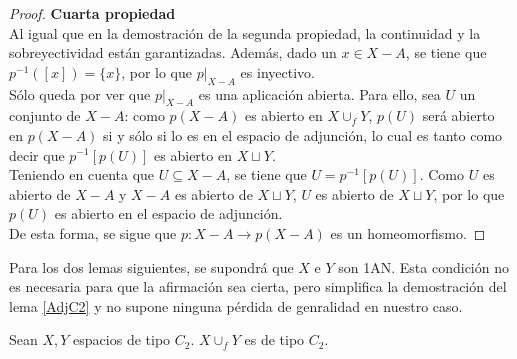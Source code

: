 \begin{proof}
\noindent \textbf{Cuarta propiedad}
\\
Al igual que en la demostración de la segunda propiedad, la continuidad y la sobreyectividad están garantizadas. Además, dado un $x \in X-A$, se tiene que $p^{-1}([x])=\{x\}$, por lo que $p|_{X-A}$ es inyectivo.
\\

Sólo queda por ver que $p|_{X-A}$ es una aplicación abierta. Para ello, sea $U$ un conjunto de $X-A$: como $p(X-A)$ es abierto en $X\cup_f Y$, $p(U)$ será abierto en $p(X-A)$ si y sólo si lo es en el espacio de adjunción, lo cual es tanto como decir que $p^{-1}[p(U)]$ es abierto en $X\sqcup Y$.
\\

Teniendo en cuenta que $U \subseteq X-A$, se tiene que $U=p^{-1}[p(U)]$. Como $U$ es abierto de $X-A$ y $X-A$ es abierto de $X\sqcup Y$, $U$ es abierto de $X\sqcup Y$, por lo que $p(U)$ es abierto en el espacio de adjunción.
\\

De esta forma, se sigue que $p: X-A \longrightarrow p(X-A)$ es un homeomorfismo.
\end{proof}

Para los dos lemas siguientes, se supondrá que $X$ e $Y$ son 1AN. Esta condición no es necesaria para que la afirmación sea cierta, pero simplifica la demostración del lema \ref{AdjC2} y no supone ninguna pérdida de genralidad en nuestro caso.

\begin{lema}\label{AdjC2} Sean $X,Y$ espacios de tipo $C_2$. $X\cup_f Y$ es de tipo $C_2$. \end{lema}

